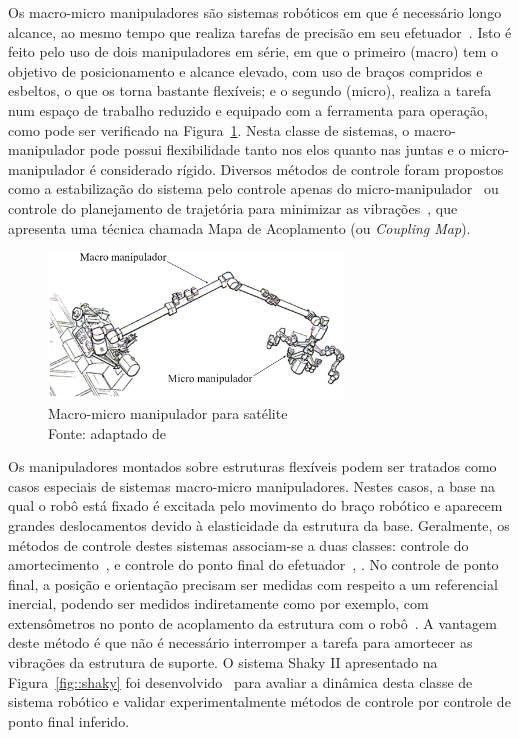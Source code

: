 Os macro-micro manipuladores são sistemas robóticos em que é necessário longo
alcance, ao mesmo tempo que realiza tarefas de precisão em seu
efetuador~\cite{sharon1993macro}.
Isto é feito pelo uso de dois manipuladores em série, em que o primeiro (macro)
tem o objetivo de posicionamento e alcance elevado, com uso de braços compridos
e esbeltos, o que os torna bastante flexíveis; e o segundo (micro), realiza a
tarefa num espaço de trabalho reduzido e equipado com a ferramenta para
operação, como pode ser verificado na Figura~\ref{fig::macro_micro}. Nesta
classe de sistemas, o macro-manipulador pode possui flexibilidade tanto nos elos
quanto nas juntas e o micro-manipulador é considerado rígido.
Diversos métodos de controle foram propostos como a estabilização do sistema
pelo controle apenas do micro-manipulador~\cite{book1989vibration} ou controle
do planejamento de trajetória para minimizar as vibrações~\cite{torres1993path},
que apresenta uma técnica chamada Mapa de Acoplamento (ou \textit{Coupling
Map}). 

\begin{figure}[h]
	\centering 
 	\includegraphics[width=0.70\textwidth]{figs/macro_micro}
 	\caption[Macro-micro manipulador]{Macro-micro manipulador para satélite \\
 	Fonte: adaptado de \cite{schubert2000impedance}}
 	\label{fig::macro_micro}
\end{figure}

Os manipuladores montados sobre estruturas flexíveis podem ser tratados como
casos especiais de sistemas macro-micro manipuladores. Nestes casos, a base na
qual o robô está fixado é excitada pelo movimento do braço robótico e aparecem
grandes deslocamentos devido à elasticidade da estrutura da base.
Geralmente, os métodos de controle destes sistemas associam-se a duas classes:
controle do amortecimento~\cite{george2002inertial}, \cite{lew2001simple} e
controle do ponto final do efetuador~\cite{sharon1993macro},
\cite{torres1993path}. No controle de ponto final, a posição e orientação
precisam ser medidas com respeito a um referencial inercial, podendo ser medidos
indiretamente como por exemplo, com extensômetros no ponto de acoplamento da
estrutura com o robô~\cite{mavroidis1997optimal}.
A vantagem deste método é que não é necessário interromper a tarefa para
amortecer as vibrações da estrutura de suporte. O sistema Shaky II apresentado
na Figura~\ref{fig::shaky} foi desenvolvido~\cite{mavroidis1997optimal}
para avaliar a dinâmica desta classe de sistema robótico e validar
experimentalmente métodos de controle por controle de ponto final inferido.

